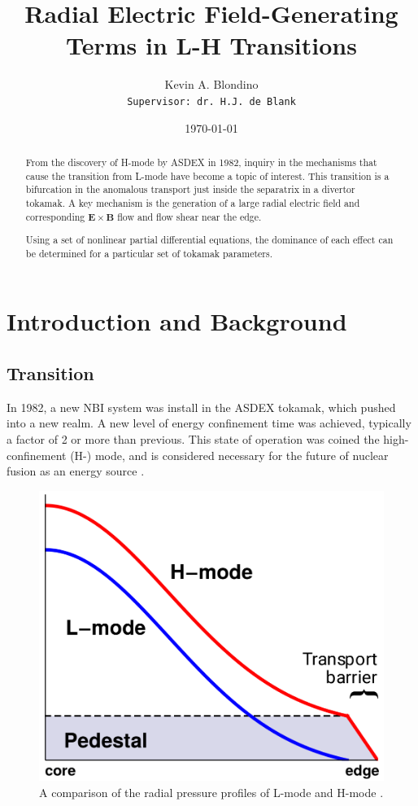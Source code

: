 \documentclass[a4paper]{article}
\author{Kevin A. Blondino \\
	\texttt{Supervisor: dr. H.J. de Blank}}
\title{Radial Electric Field-Generating Terms in L-H Transitions}
\date{\today}
\begin{document}
\maketitle


\begin{abstract}
	From the discovery of H-mode by ASDEX in 1982, inquiry in the mechanisms that cause the transition from L-mode have become a topic of interest.
	This transition is a bifurcation in the anomalous transport just inside the separatrix in a divertor tokamak.
	A key mechanism is the generation of a large radial electric field and corresponding $\mathbf{E}\times\mathbf{B}$ flow and flow shear near the edge.

	Using a set of nonlinear partial differential equations, the dominance of each effect can be determined for a particular set of tokamak parameters.
\end{abstract}

\section{Introduction and Background}
\subsection{Transition}
In 1982, a new NBI system was install in the ASDEX tokamak, which pushed into a new realm.
A new level of energy confinement time was achieved, typically a factor of 2 or more than previous.
This state of operation was coined the high-confinement (H-) mode, and is considered necessary for the future of nuclear fusion as an energy source \cite{wagner_development_1984}.

\begin{figure}
	\centering
	\includegraphics[width=0.4\linewidth]{../Graphics/L-mode_H-mode_compare.png}
	\caption{A comparison of the radial pressure profiles of L-mode and H-mode \cite{weymiens_bifurcation_2014}.}
	\label{fig:L-mode_H-mode_compare}
\end{figure}
\end{document}
